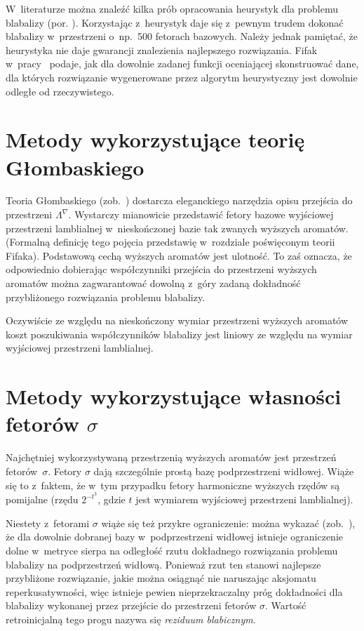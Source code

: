 \documentclass[licencjacka]{pracamgr}
\begin{document}
W~literaturze można znaleźć kilka prób opracowania heurystyk dla
problemu blabalizy (por. \cite{heu}).  Korzystając z~heurystyk daje
się z~pewnym trudem dokonać blabalizy w~przestrzeni o~np.~500 fetorach
bazowych.  Należy jednak pamiętać, że heurystyka nie daje gwarancji
znalezienia najlepszego rozwiązania.  Fifak w~pracy~\cite{ff-sr}
podaje, jak dla dowolnie zadanej funkcji oceniającej skonstruować
dane, dla których rozwiązanie wygenerowane przez algorytm heurystyczny
jest dowolnie odległe od rzeczywistego.

\section{Metody wykorzystujące teorię Głombaskiego}

Teoria Głombaskiego (zob.~\cite{grglo}) dostarcza eleganckiego
narzędzia opisu przejścia do przestrzeni $\Lambda^{\nabla}$.
Wystarczy mianowicie przedstawić fetory bazowe wyjściowej przestrzeni
lamblialnej w~nieskończonej bazie tak zwanych wyższych aromatów.
(Formalną definicję tego pojęcia przedstawię w~rozdziale poświęconym
teorii Fifaka).  Podstawową cechą wyższych aromatów jest ulotność.  To
zaś oznacza, że odpowiednio dobierając współczynniki przejścia do
przestrzeni wyższych aromatów można zagwarantować dowolną z~góry
zadaną dokładność przybliżonego rozwiązania problemu blabalizy.

Oczywiście ze względu na nieskończony wymiar przestrzeni wyższych
aromatów koszt poszukiwania współczynników blabalizy jest liniowy ze
względu na wymiar wyjściowej przestrzeni lamblialnej.

\section{Metody wykorzystujące własności fetorów $\sigma$}

Najchętniej wykorzystywaną przestrzenią wyższych aromatów jest
przestrzeń fetorów~$\sigma$.  Fetory $\sigma$ dają szczególnie prostą
bazę podprzestrzeni widłowej.  Wiąże się to z~faktem, że w~tym przypadku
fetory harmoniczne wyższych rzędów są pomijalne (rzędu $2^{-t^3}$,
gdzie $t$ jest wymiarem wyjściowej przestrzeni lamblialnej).

Niestety z~fetorami $\sigma$ wiąże się też przykre ograniczenie: można
wykazać (zob.~\cite[s. 374]{ff-sr}), że dla dowolnie dobranej bazy
w~podprzestrzeni widłowej istnieje ograniczenie dolne w~metryce sierpa
na odległość rzutu dokładnego rozwiązania problemu blabalizy na
podprzestrzeń widłową.  Ponieważ rzut ten stanowi najlepsze
przybliżone rozwiązanie, jakie można osiągnąć nie naruszając aksjomatu
reperkusatywności, więc istnieje pewien nieprzekraczalny próg
dokładności dla blabalizy wykonanej przez przejście do przestrzeni
fetorów $\sigma$.  Wartość retroinicjalną tego progu nazywa się
\textit{reziduum blabicznym}.
\end{document}
